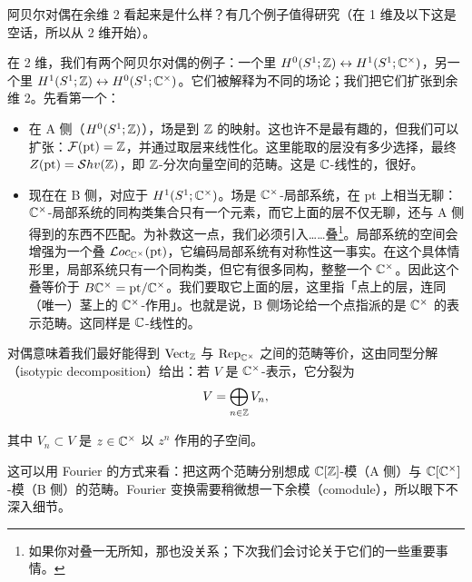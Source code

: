 阿贝尔对偶在余维 2 看起来是什么样？有几个例子值得研究（在 1 维及以下这是空话，所以从 2 维开始）。

\begin{example}
  在 2 维，我们有两个阿贝尔对偶的例子：一个里 $H^0(S^1;\mathbb{Z})\leftrightarrow H^1(S^1;\mathbb{C}^\times)$，另一个里 $H^1(S^1;\mathbb{Z})\leftrightarrow H^0(S^1;\mathbb{C}^\times)$。它们被解释为不同的场论；我们把它们扩张到余维 2。先看第一个：
  \begin{itemize}
    \item 在 A 侧（$H^0(S^1;\mathbb{Z})$），场是到 $\mathbb{Z}$ 的映射。这也许不是最有趣的，但我们可以扩张：$\mathcal{F}(\mathrm{pt})=\mathbb{Z}$，并通过取层来线性化。这里能取的层没有多少选择，最终 $Z(\mathrm{pt})=\mathcal{S}hv(\mathbb{Z})$，即 $\mathbb{Z}$-分次向量空间的范畴。这是 $\mathbb{C}$-线性的，很好。
    \item 现在在 B 侧，对应于 $H^1(S^1;\mathbb{C}^\times)$。场是 $\mathbb{C}^\times$-局部系统，在 $\mathrm{pt}$ 上相当无聊：$\mathbb{C}^\times$-局部系统的同构类集合只有一个元素，而它上面的层不仅无聊，还与 A 侧得到的东西不匹配。为补救这一点，我们必须引入……叠\footnote{如果你对叠一无所知，那也没关系；下次我们会讨论关于它们的一些重要事情。}。局部系统的空间会增强为一个叠 $\mathcal{L}oc_{\mathbb{C}^\times}(\mathrm{pt})$，它编码局部系统有对称性这一事实。在这个具体情形里，局部系统只有一个同构类，但它有很多同构，整整一个 $\mathbb{C}^\times$。因此这个叠等价于 $B\mathbb{C}^\times=\mathrm{pt}/\mathbb{C}^\times$。我们要取它上面的层，这里指「点上的层，连同（唯一）茎上的 $\mathbb{C}^\times$-作用」。也就是说，B 侧场论给一个点指派的是 $\mathbb{C}^\times$ 的表示范畴。这同样是 $\mathbb{C}$-线性的。
  \end{itemize}
  对偶意味着我们最好能得到 $\mathrm{Vect}_{\mathbb{Z}}$ 与 $\operatorname{Rep}_{\mathbb{C}^\times}$ 之间的范畴等价，这由同型分解（isotypic decomposition）给出：若 $V$ 是 $\mathbb{C}^\times$-表示，它分裂为
  \[
    V = \bigoplus_{n\in\mathbb{Z}} V_n,
  \]


  其中 $V_n\subset V$ 是 $z\in\mathbb{C}^\times$ 以 $z^n$ 作用的子空间。
\end{example}

这可以用 Fourier 的方式来看：把这两个范畴分别想成 $\mathbb{C}[\mathbb{Z}]$-模（A 侧）与 $\mathbb{C}[\mathbb{C}^\times]$-模（B 侧）的范畴。Fourier 变换需要稍微想一下余模（comodule），所以眼下不深入细节。

